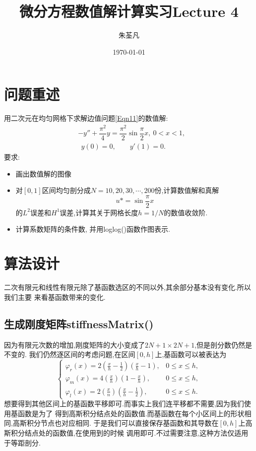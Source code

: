 \documentclass[11pt,reqno]{article}
\numberwithin{equation}{section}
\begin{document}
\title{微分方程数值解计算实习Lecture 4}

\author{朱荃凡}
\date{\today}

\maketitle

\vspace{50pt}

\section{问题重述}
用二次元在均匀网格下求解边值问题\eqref{Eqn11}的数值解:
\begin{equation}\label{Eqn11}
	\begin{split}
	&-y''+\dfrac{\pi^2}{4}y=\dfrac{\pi^2}{2}\sin\dfrac{\pi}{2}x,\ 0<x<1,\\
	&\ \ y(0)=0,\qquad y'(1)=0.
	\end{split}
\end{equation}
要求:
\begin{itemize}
	\item  画出数值解的图像
	\item 对$[0,1]$区间均匀剖分成$N=10,20,30,\cdots,200$份,计算数值解和真解
	 \[u*=\sin\dfrac{\pi}{2}x\]
	的$L^2$误差和$H^1$误差,计算其关于网格长度$h=1/N$的数值收敛阶.
	\item 计算系数矩阵的条件数, 并用loglog()函数作图表示.
\end{itemize}

\newpage

\section{算法设计}

二次有限元和线性有限元除了基函数选区的不同以外,其余部分基本没有变化.所以我们主要
来看基函数带来的变化.



\subsection{生成刚度矩阵stiffnessMatrix()}

因为有限元次数的增加,刚度矩阵的大小变成了$2N+1\times2N+1$,但是剖分数仍然是不变的.
我们仍然逐区间的考虑问题,在区间$[0,h]$上,基函数可以被表达为
\begin{equation}
	\left\{\begin{matrix}
		\varphi_r(x)=2(\frac xh-\frac{1}{2})(\frac xh-1),&0\le x\le h, \\
		 \varphi_m(x)=4(\frac{x}{h})(1-\frac{x}{h} ),\quad\ \  & 0\le x\le h,\\
		\varphi_l(x)=2(\frac{x}{n} )(\frac xh-\frac{1}{2}),\quad\ \ &0\le x\le h.
		\end{matrix}\right.
\end{equation}
想要得到其他区间上的基函数平移即可.而事实上我们连平移都不需要,因为我们使用基函数是为了
得到高斯积分结点处的函数值.而基函数在每个小区间上的形状相同,高斯积分节点也对应相同.
于是我们可以直接保存基函数和其导数在$[0,h]$上高斯积分结点处的函数值,在使用到的时候
调用即可.不过需要注意,这种方法仅适用于等距剖分.
\end{document}
